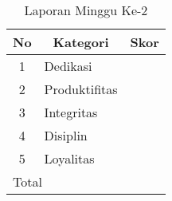 \begin{table}[]
\caption{Laporan Minggu Ke-2}
\begin{tabular}{|c|l|l|}
\hline
No & \multicolumn{1}{c|}{Kategori} & \multicolumn{1}{c|}{Skor} \\ \hline
1  & Dedikasi                      &                          \\ \hline
2  & Produktifitas                 &                          \\ \hline
3  & Integritas                    &                          \\ \hline
4  & Disiplin                      &                          \\ \hline
5  & Loyalitas                     &                          \\ \hline
\multicolumn{2}{|l|}{Total}        &                         \\ \hline
\end{tabular}
\label{tabelharian11}
\end{table} 